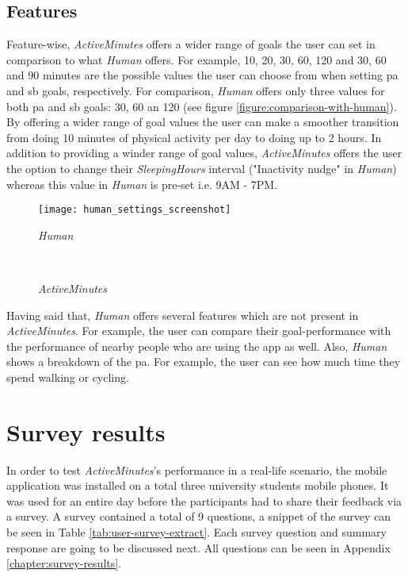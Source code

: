 \subsection{Features}
Feature-wise, \textit{ActiveMinutes} offers a wider range of goals the user can set in comparison to what \textit{Human} offers. For example, 10, 20, 30, 60, 120 and 30, 60 and 90 minutes are the possible values the user can choose from when setting \gls{pa} and \gls{sb} goals, respectively. For comparison, \textit{Human} offers only three values for both \gls{pa} and \gls{sb} goals: 30, 60 an 120 (see figure \ref{figure:comparison-with-human}). By offering a wider range of goal values the user can make a smoother transition from doing 10 minutes of physical activity per day to doing up to 2 hours. In addition to providing a winder range of goal values, \textit{ActiveMinutes} offers the user the option to change their \textit{SleepingHours} interval ("Inactivity nudge" in \textit{Human}) whereas this value in \textit{Human} is pre-set i.e. 9AM - 7PM.

\begin{figure*}[ht]
    \centering
    \begin{subfigure}[t]{0.4\textwidth}
        \centering
        \texttt{[image: human\_settings\_screenshot]}
        \caption{\textit{Human}}
    \end{subfigure}%
    ~ 
    \begin{subfigure}[t]{0.4\textwidth}
        \centering
        \caption{\textit{ActiveMinutes}}
    \end{subfigure}
    \caption{Comparing the system with other solutions}
    \label{figure:comparison-with-human}
\end{figure*}

Having said that, \textit{Human} offers several features which are not present in \textit{ActiveMinutes}. For example, the user can compare their goal-performance with the performance of nearby people who are using the app as well. Also, \textit{Human} shows a breakdown of the \gls{pa}. For example, the user can see how much time they spend walking or cycling. 

\section{Survey results}
In order to test \textit{ActiveMinutes}'s performance in a real-life scenario, the mobile application was installed on a total three university students mobile phones. It was used for an entire day before the participants had to share their feedback via a survey. A survey contained a total of 9 questions, a snippet of the survey can be seen in Table \ref{tab:user-survey-extract}. Each survey question and summary response are going to be discussed next. All questions can be seen in Appendix \ref{chapter:survey-results}.

